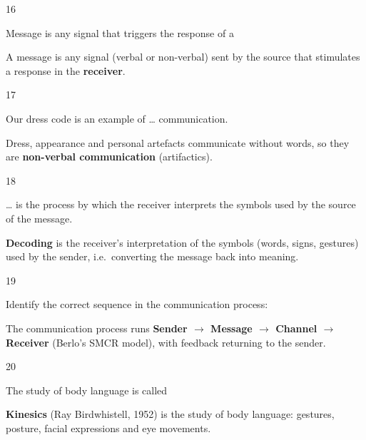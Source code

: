 \begin{question}{16}
{Message is any signal that triggers the response of a\par}
\begin{explain}
A message is any signal (verbal or non-verbal) sent by the source that stimulates a response in the \textbf{receiver}.
\end{explain}
\end{question}

\begin{question}{17}
{Our dress code is an example of \ldots{} communication.\par}
\begin{explain}
Dress, appearance and personal artefacts communicate without words, so they are \textbf{non-verbal communication} (artifactics).
\end{explain}
\end{question}

\begin{question}{18}
{\ldots{} is the process by which the receiver interprets the symbols used by the source of the message.\par}
\begin{explain}
\textbf{Decoding} is the receiver's interpretation of the symbols (words, signs, gestures) used by the sender, i.e.\ converting the message back into meaning.
\end{explain}
\end{question}

\begin{question}{19}
{Identify the correct sequence in the communication process:\par}
\begin{explain}
The communication process runs \textbf{Sender $\rightarrow$ Message $\rightarrow$ Channel $\rightarrow$ Receiver} (Berlo's SMCR model), with feedback returning to the sender.
\end{explain}
\end{question}

\begin{question}{20}
{The study of body language is called\par}
\begin{explain}
\textbf{Kinesics} (Ray Birdwhistell, 1952) is the study of body language: gestures, posture, facial expressions and eye movements.
\end{explain}
\end{question}

